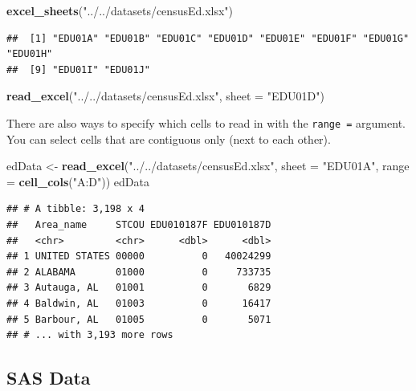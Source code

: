 \documentclass[
]{book}
\newenvironment{Shaded}{\begin{snugshade}}{\end{snugshade}}
\newcommand{\DataTypeTok}[1]{\textcolor[rgb]{0.13,0.29,0.53}{#1}}
\newcommand{\KeywordTok}[1]{\textcolor[rgb]{0.13,0.29,0.53}{\textbf{#1}}}
\newcommand{\NormalTok}[1]{#1}
\newcommand{\StringTok}[1]{\textcolor[rgb]{0.31,0.60,0.02}{#1}}
\theoremstyle{definition}
\theoremstyle{definition}
\theoremstyle{definition}
\theoremstyle{remark}
\begin{document}
\begin{Shaded}
\begin{Highlighting}[]
\KeywordTok{excel_sheets}\NormalTok{(}\StringTok{"../../datasets/censusEd.xlsx"}\NormalTok{)}
\end{Highlighting}
\end{Shaded}

\begin{verbatim}
##  [1] "EDU01A" "EDU01B" "EDU01C" "EDU01D" "EDU01E" "EDU01F" "EDU01G" "EDU01H"
##  [9] "EDU01I" "EDU01J"
\end{verbatim}

\begin{Shaded}
\begin{Highlighting}[]
\KeywordTok{read_excel}\NormalTok{(}\StringTok{"../../datasets/censusEd.xlsx"}\NormalTok{, }\DataTypeTok{sheet =} \StringTok{"EDU01D"}\NormalTok{)}
\end{Highlighting}
\end{Shaded}

There are also ways to specify which cells to read in with the \texttt{range\ =} argument. You can select cells that are contiguous only (next to each other).

\begin{Shaded}
\begin{Highlighting}[]
\NormalTok{edData <-}\StringTok{ }\KeywordTok{read_excel}\NormalTok{(}\StringTok{"../../datasets/censusEd.xlsx"}\NormalTok{, }\DataTypeTok{sheet =} \StringTok{"EDU01A"}\NormalTok{, }
                   \DataTypeTok{range =} \KeywordTok{cell_cols}\NormalTok{(}\StringTok{"A:D"}\NormalTok{))}
\NormalTok{edData}
\end{Highlighting}
\end{Shaded}

\begin{verbatim}
## # A tibble: 3,198 x 4
##   Area_name     STCOU EDU010187F EDU010187D
##   <chr>         <chr>      <dbl>      <dbl>
## 1 UNITED STATES 00000          0   40024299
## 2 ALABAMA       01000          0     733735
## 3 Autauga, AL   01001          0       6829
## 4 Baldwin, AL   01003          0      16417
## 5 Barbour, AL   01005          0       5071
## # ... with 3,193 more rows
\end{verbatim}

\hypertarget{sas-data}{%
\subsection{SAS Data}\label{sas-data}}
\end{document}
